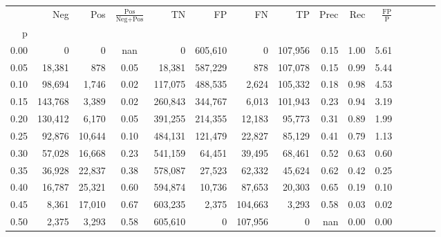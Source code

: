 \begin{tabular}{rrrcrrrrrrrrrrr}
\toprule
{} &      Neg &     Pos & $\frac{\text{Pos}}{\text{Neg}+\text{Pos}}$ &       TN &       FP &       FN &       TP &  Prec &   Rec & $\frac{\text{FP}}{\text{P}}$ \\
p    &          &         &                                            &          &          &          &          &       &       &                              \\
\midrule
0.00 &        0 &       0 &                                        nan &        0 &  605,610 &        0 &  107,956 &  0.15 &  1.00 &                         5.61 \\
0.05 &   18,381 &     878 &                                       0.05 &   18,381 &  587,229 &      878 &  107,078 &  0.15 &  0.99 &                         5.44 \\
0.10 &   98,694 &   1,746 &                                       0.02 &  117,075 &  488,535 &    2,624 &  105,332 &  0.18 &  0.98 &                         4.53 \\
0.15 &  143,768 &   3,389 &                                       0.02 &  260,843 &  344,767 &    6,013 &  101,943 &  0.23 &  0.94 &                         3.19 \\
0.20 &  130,412 &   6,170 &                                       0.05 &  391,255 &  214,355 &   12,183 &   95,773 &  0.31 &  0.89 &                         1.99 \\
0.25 &   92,876 &  10,644 &                                       0.10 &  484,131 &  121,479 &   22,827 &   85,129 &  0.41 &  0.79 &                         1.13 \\
0.30 &   57,028 &  16,668 &                                       0.23 &  541,159 &   64,451 &   39,495 &   68,461 &  0.52 &  0.63 &                         0.60 \\
0.35 &   36,928 &  22,837 &                                       0.38 &  578,087 &   27,523 &   62,332 &   45,624 &  0.62 &  0.42 &                         0.25 \\
0.40 &   16,787 &  25,321 &                                       0.60 &  594,874 &   10,736 &   87,653 &   20,303 &  0.65 &  0.19 &                         0.10 \\
0.45 &    8,361 &  17,010 &                                       0.67 &  603,235 &    2,375 &  104,663 &    3,293 &  0.58 &  0.03 &                         0.02 \\
0.50 &    2,375 &   3,293 &                                       0.58 &  605,610 &        0 &  107,956 &        0 &   nan &  0.00 &                         0.00 \\

\end{tabular}
